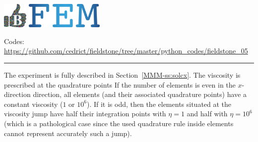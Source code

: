 \includegraphics[height=1.25cm]{images/pictograms/benchmark}
\includegraphics[height=1.25cm]{images/pictograms/FEM}





\begin{center}
\inpython
\infortran
{\small Codes: \url{https://github.com/cedrict/fieldstone/tree/master/python_codes/fieldstone_05}}
\end{center}

\par\noindent\rule{\textwidth}{0.4pt}

The experiment is fully described in Section~\ref{MMM-ss:solcx}.
The viscosity is prescribed at the quadrature points 
If the number of elements is even in the $x$-direction direction, all elements 
(and their associated quadrature points)
have a constant viscosity ($1$ or  $10^6$). If it is odd, then the elements situated 
at the viscosity jump have half their integration points with $\eta=1$ and half 
with $\eta=10^6$ 
(which is a pathological case since the used quadrature rule inside elements cannot represent 
accurately such a jump).  

